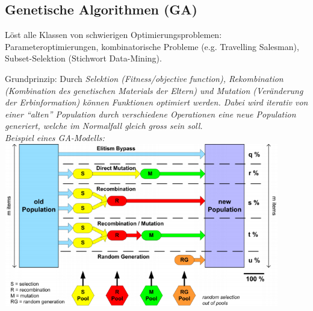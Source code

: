 \subsection{Genetische Algorithmen (GA) }
  \begin{minipage}{12cm}
    Löst alle Klassen von schwierigen Optimierungsproblemen: Parameteroptimierungen, kombinatorische Probleme (e.g. Travelling Salesman), Subset-Selektion (Stichwort Data-Mining).
  
    Grundprinzip: Durch \em Selektion \em (Fitness/objective function), \em Rekombination \em (Kombination des genetischen Materials der Eltern) und \em Mutation \em (Veränderung der Erbinformation) können Funktionen optimiert werden. Dabei wird iterativ von einer "`alten"' Population durch verschiedene Operationen eine neue Population generiert, welche im Normalfall gleich gross sein soll.\\
    
    Beispiel eines GA-Modells:\\
    \includegraphics[width=12cm]{./Content/MetaHeuristics/GeneticAlgorithms_Model}
  \end{minipage}
